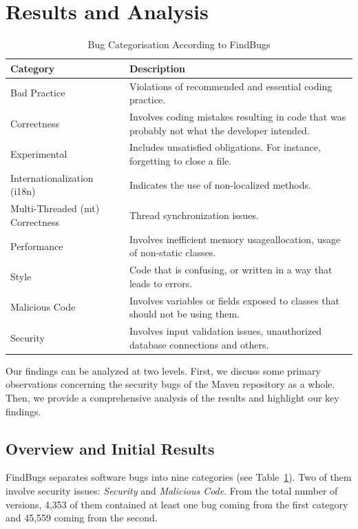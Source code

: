 \documentclass[conference]{llncs}
\begin{document}
\section{Results and Analysis}
\label{sec:res}

\begin{table}
\centering
\caption{Bug Categorisation According to FindBugs}
\label{tbl:bug-cat}
\begin{tabular}{l p{15em}}
\hline
Category & Description\\
\hline
Bad Practice & Violations of recommended and essential
coding practice. \\
Correctness & Involves coding mistakes resulting in code
that was probably not what the developer intended. \\
Experimental & Includes unsatisfied obligations. For instance,
forgetting to close a file. \\
Internationalization (i18n) & Indicates the use of non-localized methods. \\
Multi-Threaded ({\sc mt}) Correctness & Thread synchronization issues. \\
Performance & Involves inefficient memory usageallocation, usage 
of non-static classes. \\
Style & Code that is confusing, or
written in a way that leads to errors.\\
Malicious Code & Involves variables or fields exposed to classes that should
not be using them. \\
Security & Involves input validation issues, unauthorized database connections
and others. \\
\hline
\end{tabular}
\end{table}

Our findings can be analyzed at two levels. First, we discuss some
primary observations concerning the security bugs of the Maven repository as a whole.
Then, we provide a comprehensive analysis of the results and highlight our key findings.

\subsection{Overview and Initial Results}
\label{sec:overview}

FindBugs separates software bugs into nine categories (see
Table~\ref{tbl:bug-cat}). Two of them involve security issues: {\it Security} and {\it
Malicious Code}. From the total number of versions, 4,353 of them contained
at least one bug coming from the first category
and 45,559 coming from the second.
\end{document}
